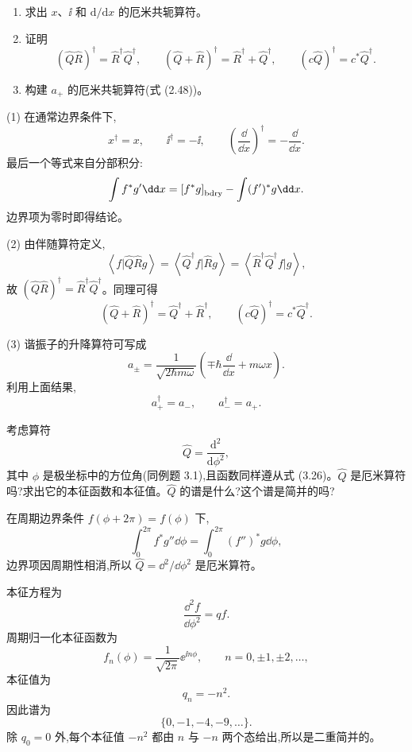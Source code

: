 \begin{question}
\begin{enumerate}
\item 求出 $x$、$\ii$ 和 $\mathrm d/\mathrm dx$ 的厄米共轭算符。
\item 证明
\[
(\hat Q\hat R)^\dagger=\hat R^\dagger\hat Q^\dagger,
\qquad
(\hat Q+\hat R)^\dagger=\hat R^\dagger+\hat Q^\dagger,
\qquad
(c\hat Q)^\dagger=c^*\hat Q^\dagger .
\]
\item 构建 $a_+$ 的厄米共轭算符(式 (2.48))。
\end{enumerate}

\par\smallskip
{}

\begin{solution}
(1) 在通常边界条件下,
\[
x^\dagger=x,
\qquad
\ii^\dagger=-\ii,
\qquad
\left(\frac{\dd}{\dd x}\right)^\dagger=-\frac{\dd}{\dd x}.
\]
最后一个等式来自分部积分:
\[
\int f^*g'\dd x=\left[f^*g\right]_{\rm bdry}-\int (f')^*g\dd x.
\]
边界项为零时即得结论。

(2) 由伴随算符定义,
\[
\left\langle f|\hat Q\hat Rg \right\rangle=\left\langle \hat Q^\dagger f|\hat Rg \right\rangle
=\left\langle \hat R^\dagger\hat Q^\dagger f|g \right\rangle,
\]
故 $(\hat Q\hat R)^\dagger=\hat R^\dagger\hat Q^\dagger$。同理可得
\[
(\hat Q+\hat R)^\dagger=\hat Q^\dagger+\hat R^\dagger,
\qquad
(c\hat Q)^\dagger=c^*\hat Q^\dagger.
\]

(3) 谐振子的升降算符可写成
\[
a_\pm=\frac1{\sqrt{2\hbar m\omega}}\left(\mp\hbar\frac{\dd}{\dd x}+m\omega x\right).
\]
利用上面结果,
\[
\boxed{a_+^\dagger=a_-},
\qquad
\boxed{a_-^\dagger=a_+}.
\]
\end{solution}
\end{question}

\begin{question}
考虑算符
\[
\hat Q=\frac{\mathrm d^2}{\mathrm d\phi^2},
\]
其中 $\phi$ 是极坐标中的方位角(同例题 3.1),且函数同样遵从式 (3.26)。$\hat Q$ 是厄米算符吗?求出它的本征函数和本征值。$\hat Q$ 的谱是什么?这个谱是简并的吗?

\par\smallskip
{}

\begin{solution}
在周期边界条件 $f(\phi+2\pi)=f(\phi)$ 下,
\[
\int_0^{2\pi} f^*g''\dd\phi
=\int_0^{2\pi} (f'')^*g\dd\phi,
\]
边界项因周期性相消,所以 $\hat Q=\dd^2/\dd\phi^2$ 是厄米算符。

本征方程为
\[
\frac{\dd^2 f}{\dd\phi^2}=qf.
\]
周期归一化本征函数为
\[
f_n(\phi)=\frac1{\sqrt{2\pi}}\ee^{\ii n\phi},
\qquad n=0,\pm1,\pm2,\ldots,
\]
本征值为
\[
q_n=-n^2.
\]
因此谱为
\[
\{0,-1,-4,-9,\ldots\}.
\]
除 $q_0=0$ 外,每个本征值 $-n^2$ 都由 $n$ 与 $-n$ 两个态给出,所以是二重简并的。
\end{solution}
\end{question}

